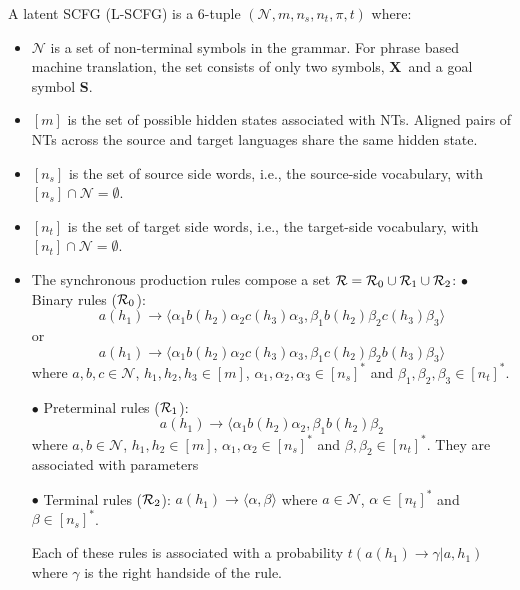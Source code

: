 \documentclass[11pt]{article}
\newcommand{\rules}{{\cal R}}
\newcommand{\bS}{{\bf S}}
\newcommand{\bX}{{\bf X}}
\newcommand{\ignore}[1]{}
\begin{document}
A latent SCFG (L-SCFG) is a 6-tuple $(\mathcal{N}, m, n_s, n_t, \pi, t)$ where: 
\begin{itemize}
  \item $\mathcal{N}$ is a set of non-terminal symbols in the grammar.  
  	For phrase based machine translation, the set consists of only two symbols, \bX~and a goal symbol \bS.  
  \item $[m]$ is the set of possible hidden states associated with NTs.  
  	Aligned pairs of NTs across the source and target languages share the same hidden state.
   \item $[n_s]$ is the set of source side words, i.e., the source-side vocabulary, with $[n_s] \cap \mathcal{N} = \emptyset$.
   \item $[n_t]$ is the set of target side words, i.e., the target-side vocabulary, with $[n_t] \cap \mathcal{N} = \emptyset$.
   \item The synchronous production rules compose a set $\rules = \rules_0 \cup \rules_1 \cup \rules_2$:
$\bullet$ Binary rules ($\rules_0$): $$a(h_1) \rightarrow \langle \alpha_1 b(h_2) \alpha_2 c(h_3) \alpha_3, \beta_1 b(h_2) \beta_2 c(h_3) \beta_3 \rangle$$ or $$a(h_1) \rightarrow \langle \alpha_1 b(h_2) \alpha_2 c(h_3) \alpha_3, \beta_1 c(h_2) \beta_2 b(h_3) \beta_3 \rangle$$ where $a,b,c \in \mathcal{N}$, $h_1,h_2,h_3 \in [m]$, $\alpha_1,\alpha_2,\alpha_3 \in [n_s]^{\ast}$ and $\beta_1,\beta_2,\beta_3 \in [n_t]^{\ast}$.

$\bullet$ Preterminal rules ($\rules_1$): $$a(h_1) \rightarrow \langle \alpha_1 b(h_2) \alpha_2, \beta_1 b(h_2) \beta_2$$ where $a,b \in \mathcal{N}$, $h_1,h_2 \in [m]$, $\alpha_1,\alpha_2 \in [n_s]^{\ast}$ and $\beta,\beta_2 \in [n_t]^{\ast}$. They are associated with parameters 

$\bullet$ Terminal rules ($\rules_2$): $a(h_1) \rightarrow \langle \alpha, \beta \rangle$ where $a \in \mathcal{N}$, $\alpha \in [n_t]^{\ast}$ and $\beta \in [n_s]^{\ast}$.

Each of these rules is associated with a probability $t(a(h_1) \rightarrow \gamma | a, h_1)$ where $\gamma$ is the right handside of the rule.

\ignore{

}
\end{itemize}
\end{document}

